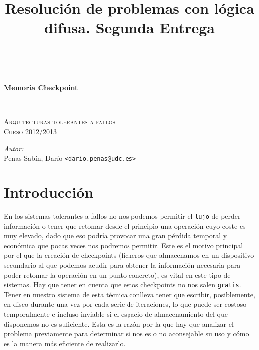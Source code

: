 \documentclass[a4paper]{article}
\title{Resolución de problemas con lógica difusa. Segunda Entrega}
\newcommand{\HRule}{\rule{\linewidth}{0.5mm}}
\begin{document}
	\begin{titlepage}
		\begin{center}

			\HRule \\[0.4cm]
			{ \huge \bfseries Memoria Checkpoint}\\[0.4cm]
			\HRule \\[0cm]

			\vspace{1cm}
			\textsc{\Large Arquitecturas tolerantes a fallos}\\[0.5cm]
			\textsc{\Large Curso 2012/2013}\\[0.5cm]
		\end{center}

		\vfill
		\hfill
		\emph{Autor:}
		\vspace{0.5cm}
		\\  
		\vspace{0.1cm}
		\hfill Penas Sabín, Darío \texttt{<dario.penas@udc.es>}\\
		\vspace{0.1cm}

	\end{titlepage}
\tableofcontents
\clearpage

\section{Introducción}
	
	En los sistemas tolerantes a fallos no nos podemos permitir el \texttt{lujo} de perder información o tener que retomar desde el principio una operación cuyo coste es muy elevado, dado que eso podría provocar una gran pérdida temporal y económica que pocas veces nos podremos permitir.
	Este es el motivo principal por el que la creación de checkpoints (ficheros que almacenamos en un dispositivo secundario al que podemos acudir para obtener la información necesaria para poder retomar la operación en un punto concreto), es vital en este tipo de sistemas.
	Hay que tener en cuenta que estos checkpoints no nos salen \texttt{gratis}. Tener en nuestro sistema de esta técnica conlleva tener que escribir, posiblemente, en disco durante una vez por cada serie de iteraciones, lo que puede ser costoso temporalmente e incluso inviable si el espacio de almacenamiento del que disponemos no es suficiente. Esta es la razón por la que hay que analizar el problema previamente para determinar si nos es o no aconsejable su uso y cómo es la manera más eficiente de realizarlo.
	
\end{document}

